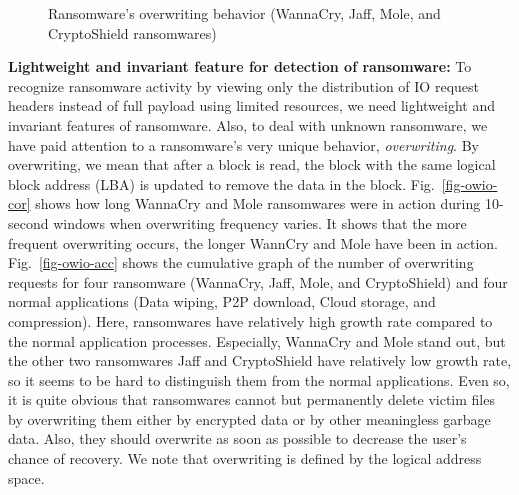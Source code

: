 \documentclass[conference]{IEEEtran}
\begin{document}
\begin{figure}
	\centering
	\caption{Ransomware's overwriting behavior (WannaCry, Jaff, Mole, and CryptoShield ransomwares)}
\end{figure}

{\noindent\bf Lightweight and invariant feature for detection of ransomware:}
To recognize ransomware activity by viewing only the distribution of IO request headers 
instead of full payload using limited resources, we need lightweight and invariant features of ransomware.
Also, to deal with unknown ransomware, we have paid attention to a ransomware's very unique behavior,
{\em overwriting}. By overwriting, we mean that after a block is read, the block with the same logical
block address (LBA) is updated to remove the data in the block.
Fig.~\ref{fig-owio-cor} shows how long WannaCry and Mole ransomwares were in action 
during 10-second windows when overwriting frequency varies. It shows that the more frequent overwriting occurs, 
the longer WannCry and Mole have been in action.
Fig.~\ref{fig-owio-acc} shows the cumulative graph of the number of overwriting requests for four ransomware 
(WannaCry, Jaff, Mole, and CryptoShield) and four normal applications (Data wiping, P2P download, 
Cloud storage, and compression). Here, ransomwares have relatively high growth rate compared to the normal
application processes. Especially, WannaCry and Mole stand out, but the other two ransomwares Jaff 
and CryptoShield have relatively low growth rate, so it seems to be hard to distinguish them from the normal
applications. Even so, it is quite obvious that ransomwares cannot but permanently delete victim files by 
overwriting them either by encrypted data or by other meaningless garbage data. Also, they should overwrite
as soon as possible to decrease the user's chance of recovery. We note that overwriting is defined by the logical
address space.
\end{document}
